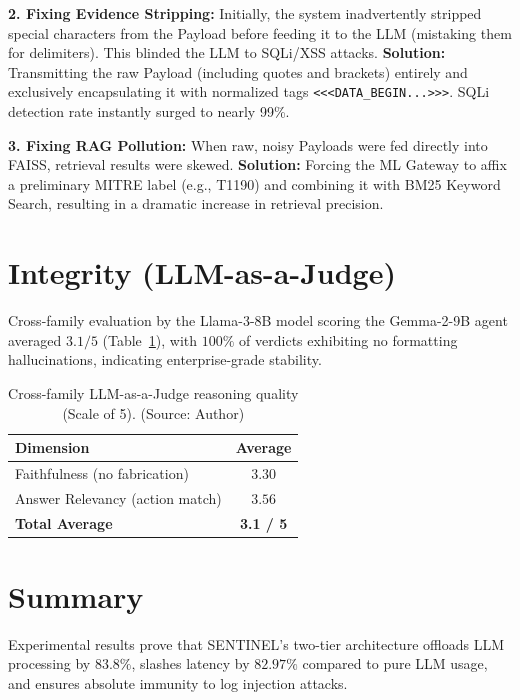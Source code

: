 \textbf{2. Fixing Evidence Stripping:}
Initially, the system inadvertently stripped special characters from the Payload before feeding it to the LLM (mistaking them for delimiters). This blinded the LLM to SQLi/XSS attacks. \textbf{Solution:} Transmitting the raw Payload (including quotes and brackets) entirely and exclusively encapsulating it with normalized tags \texttt{<<<DATA\_BEGIN...>>>}. SQLi detection rate instantly surged to nearly 99\%.

\textbf{3. Fixing RAG Pollution:}
When raw, noisy Payloads were fed directly into FAISS, retrieval results were skewed. \textbf{Solution:} Forcing the ML Gateway to affix a preliminary MITRE label (e.g., T1190) and combining it with BM25 Keyword Search, resulting in a dramatic increase in retrieval precision.

\section{Integrity (LLM-as-a-Judge)}
Cross-family evaluation by the Llama-3-8B model scoring the Gemma-2-9B agent averaged $3.1/5$ (Table~\ref{tab:ragas}), with $100\%$ of verdicts exhibiting no formatting hallucinations, indicating enterprise-grade stability.

\begin{table}[!htbp]
    \centering
    \caption{Cross-family LLM-as-a-Judge reasoning quality (Scale of 5). (Source: Author)}
    \label{tab:ragas}
    \begin{tabular}{|l|c|}
        \hline
        \textbf{Dimension} & \textbf{Average} \\ \hline
        Faithfulness (no fabrication) & $3.30$ \\ \hline
        Answer Relevancy (action match) & $3.56$ \\ \hline
        \textbf{Total Average} & \textbf{3.1 / 5} \\ \hline
    \end{tabular}
\end{table}

\section{Summary}
Experimental results prove that SENTINEL's two-tier architecture offloads LLM processing by $83.8\%$, slashes latency by $82.97\%$ compared to pure LLM usage, and ensures absolute immunity to log injection attacks.
